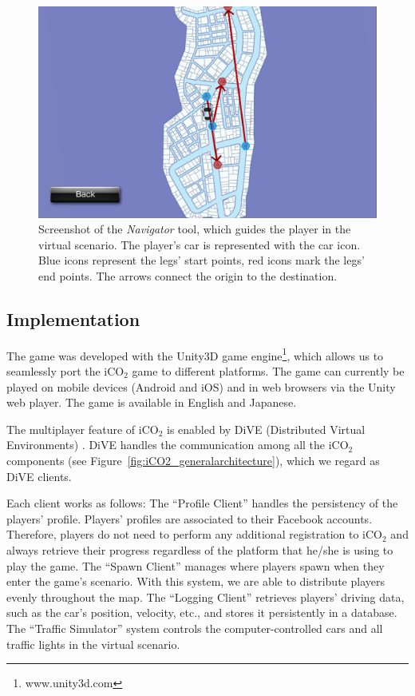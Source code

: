 \documentclass[preprint,authoryear,12pt]{elsarticle}
\begin{document}
\begin{figure}[htb]
\begin{center}
\includegraphics[width=.95\linewidth]{ijhcs14-img/iCO2_navigator}
\caption{Screenshot of the \textit{Navigator} tool, which guides the player in the virtual scenario. The player's car is represented with the car icon. Blue icons represent the legs' start points, red icons mark the legs' end points. The arrows connect the origin to the destination.\label{fig:iCO2_navigator}}
\end{center}
\end{figure}



\subsection{Implementation}

The game was developed with the Unity3D game engine\footnote{www.unity3d.com}, which allows us to seamlessly port the iCO$_2$ game to different platforms. The game can currently be played on mobile devices (Android and iOS) and in web browsers via the Unity web player. The game is available in English and Japanese.

The multiplayer feature of iCO$_2$ is enabled by DiVE (Distributed Virtual Environments) \citep{prendingeroliveira2014}. DiVE handles the communication among all the iCO$_2$ components (see Figure~\ref{fig:iCO2_generalarchitecture}), which we regard as DiVE clients.

Each client works as follows: The ``Profile Client'' handles the persistency of the players' profile. Players' profiles are associated to their Facebook accounts. Therefore, players do not need to perform any additional registration to iCO$_2$ and always retrieve their progress regardless of the platform that he/she is using to play the game. The ``Spawn Client'' manages where players spawn when they enter the game's scenario. With this system, we are able to distribute players evenly throughout the map. The ``Logging Client'' retrieves players' driving data, such as the car's position, velocity, etc., and stores it persistently in a database. The ``Traffic Simulator'' system controls the computer-controlled cars and all traffic lights in the virtual scenario.
\end{document}
